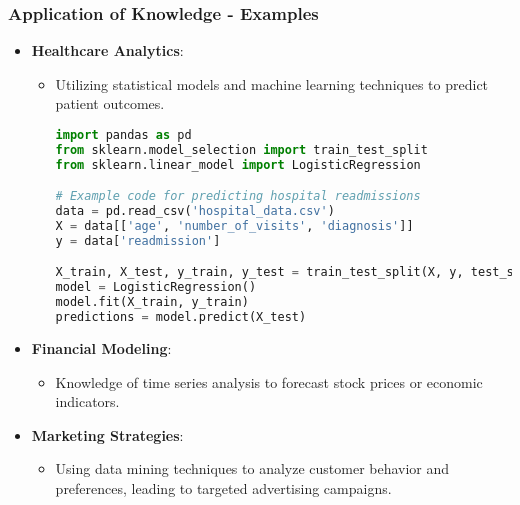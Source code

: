 \documentclass[aspectratio=169]{beamer}
\begin{document}
\begin{frame}[fragile]
    \frametitle{Application of Knowledge - Examples}
    \begin{itemize}
        \item \textbf{Healthcare Analytics}:
            \begin{itemize}
                \item Utilizing statistical models and machine learning techniques to predict patient outcomes.

                \begin{lstlisting}[language=Python]
import pandas as pd
from sklearn.model_selection import train_test_split
from sklearn.linear_model import LogisticRegression

# Example code for predicting hospital readmissions
data = pd.read_csv('hospital_data.csv')
X = data[['age', 'number_of_visits', 'diagnosis']]
y = data['readmission']

X_train, X_test, y_train, y_test = train_test_split(X, y, test_size=0.2, random_state=42)
model = LogisticRegression()
model.fit(X_train, y_train)
predictions = model.predict(X_test)
                \end{lstlisting}
            \end{itemize}
        \item \textbf{Financial Modeling}:
            \begin{itemize}
                \item Knowledge of time series analysis to forecast stock prices or economic indicators.
            \end{itemize}
        \item \textbf{Marketing Strategies}:
            \begin{itemize}
                \item Using data mining techniques to analyze customer behavior and preferences, leading to targeted advertising campaigns.
            \end{itemize}
    \end{itemize}
\end{frame}
\end{document}
